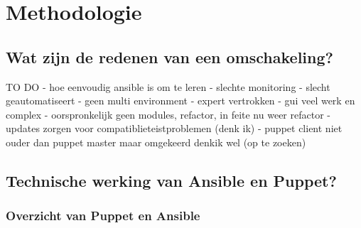 
\chapter{Methodologie}
\label{ch:methodologie}


\section{Wat zijn de redenen van een omschakeling?}
\label{sec:methodologie-redenen-omschakeling}

TO DO
- hoe eenvoudig ansible is om te leren
- slechte monitoring
- slecht geautomatiseert 
- geen multi environment
- expert vertrokken
- gui veel werk en complex
- oorspronkelijk geen modules, refactor, in feite nu weer refactor
- updates zorgen voor compatiblieteistproblemen (denk ik)
- puppet client niet ouder dan puppet master maar omgekeerd denkik wel (op te zoeken)

\section{Technische werking van Ansible en Puppet?}
\label{sec:methodologie-technische-verschillen}

\subsection{Overzicht van Puppet en Ansible}



